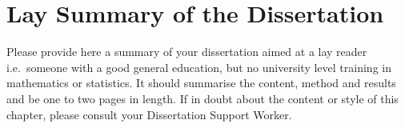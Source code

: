 \chapter{Lay Summary of the Dissertation}

Please provide here a summary of your dissertation aimed at a lay reader i.e.\ someone with a good general education, but no university level training in mathematics or statistics.   It should summarise the content, method and results and be one to two pages in length. If in doubt about the content or style of this chapter, please consult your Dissertation Support Worker.